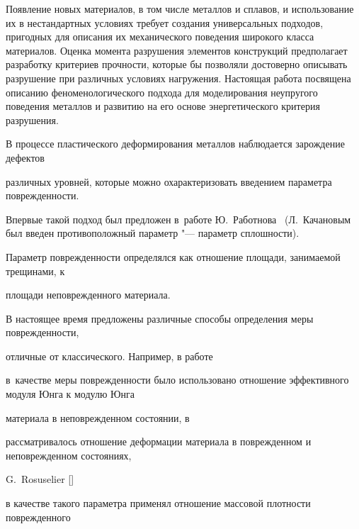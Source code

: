 




\makerutitle






Появление новых материалов, в том числе металлов и сплавов, и использование их в нестандартных условиях требует создания универсальных подходов, пригодных для описания их механического поведения широкого класса материалов. Оценка момента разрушения элементов конструкций предполагает разработку критериев прочности, которые бы позволяли достоверно описывать разрушение при различных условиях нагружения. Настоящая работа посвящена описанию феноменологического подхода для моделирования неупругого поведения металлов и развитию на его основе энергетического критерия разрушения.



В процессе пластического деформирования металлов наблюдается зарождение дефектов

различных уровней, которые можно охарактеризовать введением параметра поврежденности.

Впервые такой подход был предложен в~работе Ю.~Работнова~\cite{kostina:bib:Rabotnov} (Л.~Качановым \cite{kostina:bib:Kachanov} был введен противоположный параметр "--- параметр сплошности).

Параметр поврежденности определялся как отношение площади, занимаемой трещинами, к

площади неповрежденного материала.

В настоящее время предложены различные способы определения меры поврежденности,

отличные от классического. Например, в работе~\cite{kostina:bib:LemDes}

в~качестве меры поврежденности было использовано отношение эффективного модуля Юнга к модулю Юнга

материала в неповрежденном состоянии, в \cite{kostina:bib:PiechPach}

рассматривалось отношение деформации материала в поврежденном и неповрежденном состояниях,

G.~Rosuselier []

в качестве такого параметра применял отношение массовой плотности поврежденного

